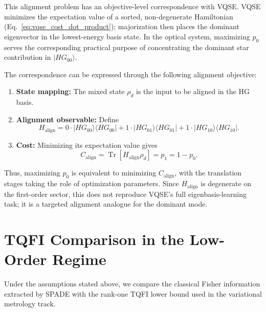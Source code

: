 This alignment problem has an objective-level correspondence with VQSE. VQSE minimizes the expectation value of a sorted, non-degenerate Hamiltonian (Eq.~\eqref{eq:vqse_cost_dot_product}); majorization then places the dominant eigenvector in the lowest-energy basis state. In the optical system, maximizing $p_0$ serves the corresponding practical purpose of concentrating the dominant star contribution in $|HG_{00}\rangle$.

The correspondence can be expressed through the following alignment objective:
\begin{enumerate}
    \item \textbf{State mapping:} The mixed state $\rho_d$ is the input to be aligned in the HG basis.
    \item \textbf{Alignment observable:} Define
          \begin{equation}
              H_{\text{align}} = 0 \cdot |HG_{00}\rangle\langle HG_{00}| + 1 \cdot |HG_{01}\rangle\langle HG_{01}| + 1 \cdot |HG_{10}\rangle\langle HG_{10}|.
          \end{equation}
    \item \textbf{Cost:} Minimizing its expectation value gives
          \begin{equation}
              C_{\text{align}} = \operatorname{Tr}[H_{\text{align}}\rho_d] = p_1 = 1 - p_0.
          \end{equation}
\end{enumerate}
Thus, maximizing $p_0$ is equivalent to minimizing $C_{\text{align}}$, with the translation stages taking the role of optimization parameters. Since $H_{\text{align}}$ is degenerate on the first-order sector, this does not reproduce VQSE's full eigenbasis-learning task; it is a targeted alignment analogue for the dominant mode.

\section{TQFI Comparison in the Low-Order Regime}

Under the assumptions stated above, we compare the classical Fisher information extracted by SPADE with the rank-one TQFI lower bound used in the variational metrology track.

